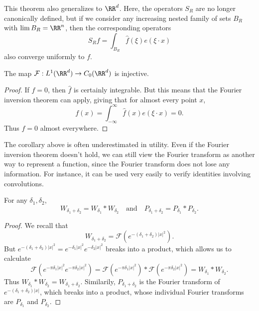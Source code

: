 \begin{remark}
    This theorem also generalizes to $\RR^d$. Here, the operators $S_R$ are no longer canonically defined, but if we consider any increasing nested family of sets $B_R$ with $\lim B_R = \RR^n$, then the corresponding operators
    \[ S_R f = \int_{B_R} \widehat{f}(\xi) e(\xi \cdot x) \]
    also converge uniformly to $f$.
\end{remark}

\begin{corollary}
    The map $\mathcal{F}: L^1(\RR^d) \to C_0(\RR^d)$ is injective.
\end{corollary}
\begin{proof}
    If $\widehat{f} = 0$, then $\widehat{f}$ is certainly integrable. But this means that the Fourier inversion theorem can apply, giving that for almost every point $x$,
    \[ f(x) = \int_{-\infty}^\infty \widehat{f}(x) e(\xi \cdot x) = 0. \]
    Thus $f = 0$ almost everywhere.
\end{proof}

The corollary above is often underestimated in utility. Even if the Fourier inversion theorem doesn't hold, we can still view the Fourier transform as another way to represent a function, since the Fourier transform does not lose any information. For instance, it can be used very easily to verify identities involving convolutions.

\begin{corollary}
    For any $\delta_1, \delta_2$,
    \[ W_{\delta_1 + \delta_2} = W_{\delta_1} * W_{\delta_2}\quad\text{and}\quad P_{\delta_1 + \delta_2} = P_{\delta_1} * P_{\delta_2}. \]
\end{corollary}
\begin{proof}
    We recall that
    \[ W_{\delta_1 + \delta_2} = \mathcal{F}(e^{-(\delta_1 + \delta_2) |x|^2}). \]
    But $e^{-(\delta_1 + \delta_2) |x|^2} = e^{-\delta_1 |x|^2} e^{-\delta_2 |x|^2}$ breaks into a product, which allows us to calculate
    \[ \mathcal{F}(e^{-\pi \delta_1 |x|^2} e^{-\pi \delta_2 |x|^2}) = \mathcal{F}(e^{-\pi \delta_1 |x|^2}) * \mathcal{F}(e^{-\pi \delta_2 |x|^2}) = W_{\delta_1} * W_{\delta_2}.  \]
    Thus $W_{\delta_1} * W_{\delta_2} = W_{\delta_1 + \delta_2}$. Similarily, $P_{\delta_1 + \delta_2}$ is the Fourier transform of $e^{-(\delta_1 + \delta_2)|x|}$, which breaks into a product, whose individual Fourier transforms are $P_{\delta_1}$ and $P_{\delta_2}$.
\end{proof}

